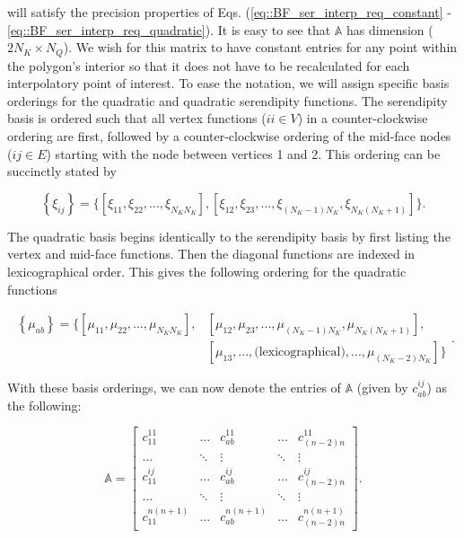 \noindent will satisfy the precision properties of Eqs. (\ref{eq::BF_ser_interp_req_constant} - \ref{eq::BF_ser_interp_req_quadratic}). It is easy to see that $\mathbb{A}$ has dimension ($2 N_K \times N_Q$). We wish for this matrix to have constant entries for any point within the polygon's interior so that it does not have to be recalculated for each interpolatory point of interest. To ease the notation, we will assign specific basis orderings for the quadratic and quadratic serendipity functions. The serendipity basis is ordered such that all vertex functions ($ii \in V$) in a counter-clockwise ordering are first, followed by a counter-clockwise ordering of the mid-face nodes ($ij \in E$) starting with the node between vertices 1 and 2. This ordering can be succinctly stated by

\begin{equation}
\label{eq::BF_ser_ordering}
\left\{ \xi_{ij} \right\} = \Big\{ \left[  \xi_{11}, \xi_{22}, ... , \xi_{N_K N_K} \right] , \left[ \xi_{12}, \xi_{23}, ..., \xi_{(N_K-1)N_K}, \xi_{N_K(N_K+1)} \right] \Big\} .
\end{equation}

\noindent The quadratic basis begins identically to the serendipity basis by first listing the vertex and mid-face functions. Then the diagonal functions are indexed in lexicographical order. This gives the following ordering for the quadratic functions

\begin{equation}
\label{eq::BF_quad_ordering}
\begin{aligned}
\left\{ \mu_{ab} \right\} = \Big\{ \left[  \mu_{11}, \mu_{22}, ... , \mu_{N_K N_K} \right] , &\left[ \mu_{12}, \mu_{23}, ..., \mu_{(N_K-1)N_K}, \mu_{N_K(N_K+1)} \right] ,\\ 
&\left[ \mu_{13}, ..., \text{(lexicographical)} ,..., \mu_{(N_K-2)N_K} \right] \Big\} 
\end{aligned} .
\end{equation}

\noindent With these basis orderings, we can now denote the entries of $\mathbb{A}$ (given by $c_{ab}^{ij}$) as the following:

\begin{equation}
\label{eq::BF_quad_to_ser_matrix_constraints}
\mathbb{A} = 
\left[
\begin{array}{ccccc}
c_{11}^{11} & \ldots & c_{ab}^{11} & \ldots & c_{(n-2)n}^{11} \\
\ldots&\ddots&\vdots&\ddots&\vdots \\
c_{11}^{ij} & \ldots & c_{ab}^{ij} & \ldots & c_{(n-2)n}^{ij} \\
\ldots&\ddots&\vdots&\ddots&\vdots \\
c_{11}^{n(n+1)} & \ldots & c_{ab}^{n(n+1)} & \ldots & c_{(n-2)n}^{n(n+1)} 
\end{array}
\right] .
\end{equation}

